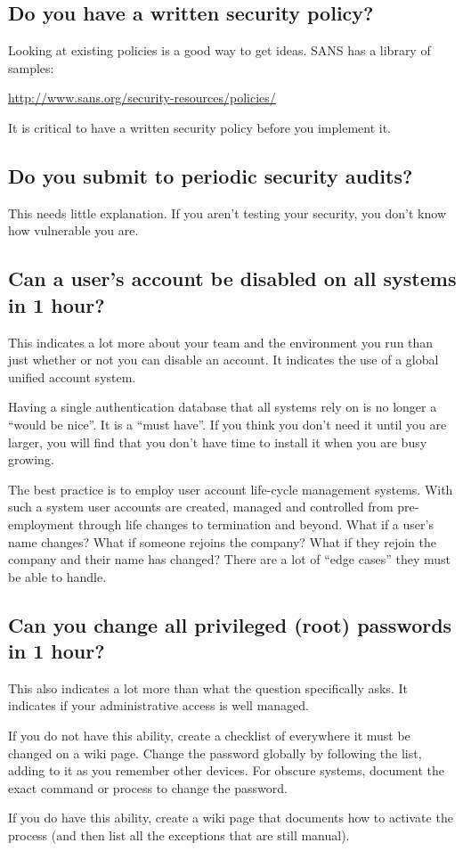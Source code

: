 \documentclass{article}
\begin{document}
\subsection{Do you have a written security policy?}
Looking at existing policies is a good way to get ideas. SANS has a library of samples:

\url{http://www.sans.org/security-resources/policies/}

It is critical to have a written security policy before you implement it.

\subsection{Do you submit to periodic security audits?}
This needs little explanation. If you aren't testing your security, you don't know how vulnerable you are.

\subsection{Can a user's account be disabled on all systems in 1 hour?}
This indicates a lot more about your team and the environment you run than just whether or not you can disable an account. It indicates the use of a global unified account system.

Having a single authentication database that all systems rely on is no longer a ``would be nice''. It is a ``must have''. If you think you don't need it until you are larger, you will find that you don't have time to install it when you are busy growing.

The best practice is to employ user account life-cycle management systems. With such a system user accounts are created, managed and controlled from pre-employment through life changes to termination and beyond. What if a user's name changes? What if someone rejoins the company? What if they rejoin the company and their name has changed? There are a lot of ``edge cases'' they must be able to handle.

\subsection{Can you change all privileged (root) passwords in 1 hour?}
This also indicates a lot more than what the question specifically asks. It indicates if your administrative access is well managed.

If you do not have this ability, create a checklist of everywhere it must be changed on a wiki page. Change the password globally by following the list, adding to it as you remember other devices. For obscure systems, document the exact command or process to change the password.

If you do have this ability, create a wiki page that documents how to activate the process (and then list all the exceptions that are still manual).
\end{document}
